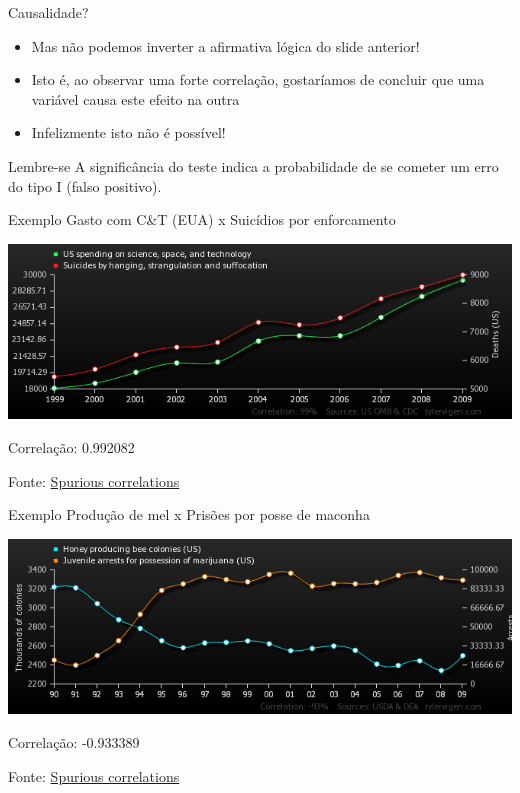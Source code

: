 \documentclass{beamer}
\begin{document}
\begin{frame}{\scriptsize Causalidade?}
  \begin{itemize}
    \footnotesize
  \item Mas não podemos inverter a afirmativa lógica do slide
    anterior!
    \bigskip
  \item Isto é, ao observar uma forte correlação, gostaríamos de
    concluir que uma variável \alert{causa} este efeito na outra
    \bigskip
  \item Infelizmente isto não é possível!
  \end{itemize}
  \vfill
  \begin{block}{Lembre-se}
    \scriptsize
    A significância do teste indica a probabilidade de se cometer um
    erro do tipo I (falso positivo).
  \end{block}
\end{frame}


\begin{frame}{\scriptsize Exemplo}
  \scriptsize
  Gasto com C\&T (EUA) x Suicídios por enforcamento
  \bigskip

  \includegraphics[width=\textwidth]{Cap17/us-spending-on-science-space-and-technology_suicides-by-hanging-strangulation-and-suffocation}

  \bigskip
  Correlação: 0.992082

  \vfill
  \hfill \tiny Fonte: \href{https://www.tylervigen.com/spurious-correlations}{Spurious correlations}
\end{frame}

\begin{frame}{\scriptsize Exemplo}
  \scriptsize
  Produção de mel x Prisões por posse de maconha
  \bigskip

  \includegraphics[width=\textwidth]{Cap17/honey-producing-bee-colonies-us_juvenile-arrests-for-possession-of-marijuana-us}

  \bigskip
  Correlação: -0.933389

  \vfill
  \hfill \tiny Fonte: \href{https://www.tylervigen.com/spurious-correlations}{Spurious correlations}
\end{frame}
\end{document}
